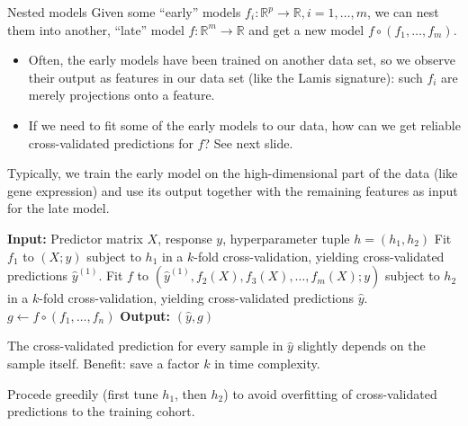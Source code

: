 \documentclass[10pt, aspectratio=169]{beamer}
\def\RR{\mathbb{R}}
\begin{document}
\begin{frame}{Nested models}
  Given some ``early'' models $f_i: \RR^p \to \RR, i = 1, \ldots, m$, we can nest 
  them into another, ``late'' model $f: \RR^m \to \RR$ and get a new model 
  $f \circ (f_1, \ldots, f_m)$.

  \pause
  \begin{itemize}
    \item Often, the early models have been trained on another data set, so we 
      observe their output as features in our data set (like the Lamis 
      signature): such $f_i$ are merely projections onto a feature.
    \item If we need to fit some of the early models to our data, how can we 
      get reliable cross-validated predictions for $f$? See next slide.
  \end{itemize}
  \pause

  Typically, we train the early  model on the high-dimensional 
  part of the data (like gene expression) and use its output together with the 
  remaining features as input for the late model.
\end{frame}

\begin{frame}{}
  \begin{algorithm}[H]
    \caption{Nested pseudo cross validation} \label{alg:nested-pcv}
    \begin{algorithmic}[1]
      \State \textbf{Input:} Predictor matrix $X$, response $y$, 
        hyperparameter tuple $h = (h_1, h_2)$
      \State Fit $f_1$ to $(X; y)$ subject to $h_1$ in a $k$-fold cross-validation, 
        yielding cross-validated predictions $\hat{y}^{(1)}$.
      \State Fit $f$ to $(\hat{y}^{(1)}, f_2(X), f_3(X), \ldots, f_m(X); y)$ 
        subject to $h_2$ in a $k$-fold cross-validation, yielding 
        cross-validated predictions $\hat{y}$.
      \State $g \gets f \circ (f_1, \ldots, f_n)$
      \State \textbf{Output:} $(\hat{y}, g)$
    \end{algorithmic}
  \end{algorithm}

The  cross-validated prediction for every sample in $\hat{y}$ slightly 
depends on the sample itself. Benefit: save a factor $k$ in time complexity.

Procede greedily (first tune $h_1$, then $h_2$) to avoid 
overfitting of cross-validated predictions to the training cohort.
\end{frame}

\end{document}
